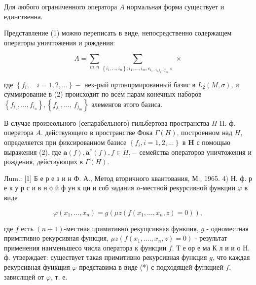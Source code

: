 \documentclass[10pt]{article}
\begin{document}
Для любого ограниченного оператора $A$ нормальная форма существует и единственна.



Представление (1) можно переписать в виде, непосредственно содержащем операторы уничтожения и рождения:



\[

A=\sum_{m, n} \sum_{\left\{i_{1}, \ldots, i_{n}\right\} ; i_{1}, \ldots, i_{m}, c_{i_{1} \ldots i_{n} j_{1} \ldots j_{m}} \times} \times

\]



где $\left\{f_{i}, \quad i=1,2, \ldots\right\}-$ нек-рый ортонормированный базис в $L_{2}(M, \sigma)$, и суммирование в (2) происходит по всем парам конечных наборов $\left\{f_{i_{1}}, \ldots, f_{i_{n}}\right\},\left\{f_{j_{1}}, \ldots\right.$, $\left.f_{j_{m}}\right\}$ элеменгов этого базиса.



В случае произеольного (сепарабельного) гильбертова пространства $H$ H. ф. оператора $A$. действующего в пространстве Фока $\Gamma(H)$, построенном над $H$, определяется при фиксированном базисе $\left\{f_{i}, i=1,2, \ldots\right\}$ в $\boldsymbol{H}$ с помощью выражения (2), где $\boldsymbol{a}(f), \boldsymbol{a}^{*}(f), f \in \dot{H},-$ семейства операторов уничтожения и рождения, действующих в $\Gamma(H)$.



Лum.: [1] Б е р е з и н Ф. А., Метод вторичного квантования, М., 1965. 4) Н. ф. р е к у р с и в н о й ф ун к ци и соб задания $n$-местной рекурсивной функции $\varphi$ в виде



\[

\varphi\left(x_{1}, \ldots, x_{n}\right)=g\left(\mu z\left(f\left(x_{1}, \ldots, x_{n}, z\right)=0\right)\right),

\]



где $f$ есть $(n+1)$-местная примитивно рекущсивная функпия, $g$ - одноместная примптивно рекурсивная функция, $\mu z\left(f\left(x_{1}, \ldots ., x_{n}, z\right)=0\right)$ - результат применения наименьшесо числа оператора к функции $f$. Т е ор е ма К л и и о Н. ф. утверждает: существует такая примитивно рекурсивная функция $g$, что каждая рекурсивная функщия $\varphi$ представима в виде (*) с подходящей функцией $f$, завислщей от $\varphi$, т. е.
\end{document}
